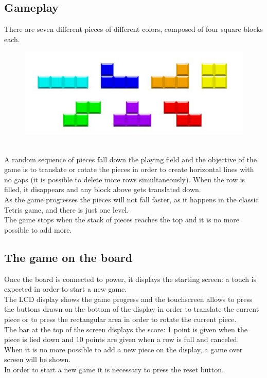 \documentclass[18pt,oneside,a4paper, titlepage]{article}
\begin{document}
	\subsection{Gameplay}
		There are seven different pieces of different colors, composed of four square blocks each.\\
		\begin{figure}[h]
			\centering
			\includegraphics[scale=0.7]{blocks.jpg}
		\end{figure}
		\\
		A random sequence of pieces fall down the playing field and the objective of the game is to translate or rotate the pieces in order to create horizontal lines with no gaps (it is possible to delete more rows simultaneously). When the row is filled, it disappears and any block above gets translated down.\\
		As the game progresses the pieces will not fall faster, as it happens in the classic Tetris game, and there is just one level.\\The game stops when the stack of pieces reaches the top and it is no more possible to add more. 
	\subsection{The game on the board}
		Once the board is connected to power, it displays the starting screen: a touch is expected in order to start a new game.\\
		The LCD display shows the game progress and the touchscreen allows to press the buttons drawn on the bottom of the display in order to translate the current piece or to press the rectangular area in order to rotate the current piece.\\
		The bar at the top of the screen displays the score: 1 point is given when the piece is lied down and 10 points are given when a row is full and canceled.\\
		When it is no more possible to add a new piece on the display, a game over screen will be shown.\\
		In order to start a new game it is necessary to press the reset button.
\newpage
\end{document}
